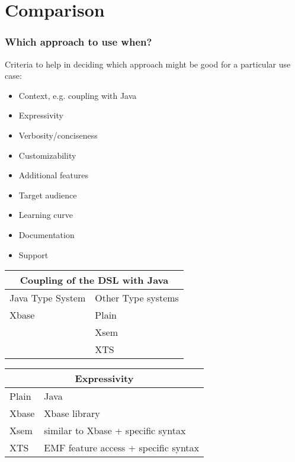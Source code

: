 \section{Comparison}

\begin{frame}
  \frametitle{Which approach to use when?}
  
  Criteria to help in deciding which approach might be good for a particular use
  case:
  \begin{itemize}
    \item Context, e.g. coupling with Java
    \item Expressivity
    \item Verbosity/conciseness
    \item Customizability
    \item Additional features
    \item Target audience
    \item Learning curve
    \item Documentation
    \item Support
  \end{itemize}

\framebreak  
\begin{tabularx}{\linewidth}{ X   X }
\multicolumn{2}{c}{Coupling of the DSL with Java} \\ \hline
Java Type System & Other Type systems \\ \hline
Xbase & Plain  \\
& Xsem  \\
& XTS  \\
\end{tabularx}
\begin{itemize}
\end{itemize}

\framebreak
\begin{tabularx}{\linewidth}{ l   X }
\multicolumn{2}{c}{Expressivity} \\ \hline
Plain & Java \\
Xbase & Xbase library \\
Xsem & similar to Xbase + specific syntax\\
XTS & EMF feature access + specific syntax\\
\end{tabularx}


\end{frame}
